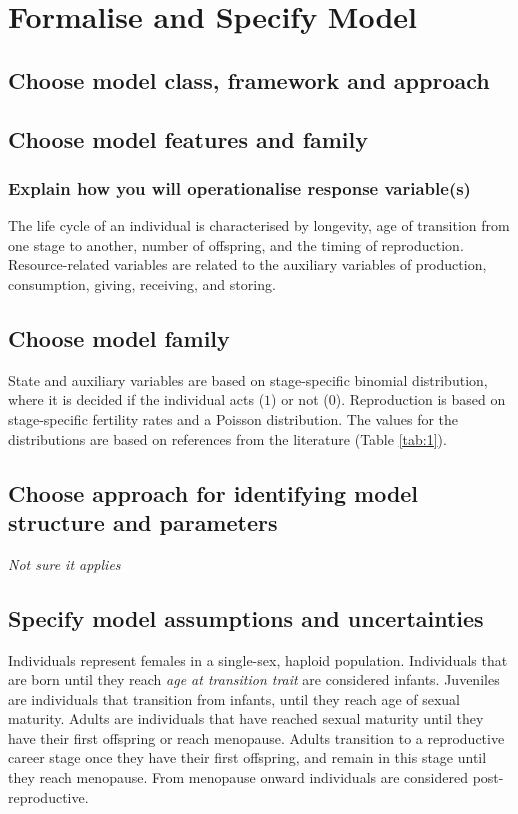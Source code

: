 \documentclass{article}
\begin{document}
\section{Formalise and Specify Model}

\subsection{Choose model class, framework and approach}


\subsection{Choose model features and family}

\subsubsection{Explain how you will operationalise response variable(s)}

The life cycle of an individual is characterised by longevity, age of transition from one stage to another, number of offspring, and the timing of reproduction. Resource-related variables are related to the auxiliary variables of production, consumption, giving, receiving, and storing.

\subsection{Choose model family}

State and auxiliary variables are based on stage-specific binomial distribution, where it is decided if the individual acts ($1$) or not ($0$). Reproduction is based on stage-specific fertility rates and a Poisson distribution. The values for the distributions are based on references from the literature (Table \ref{tab:1}).

\subsection{Choose approach for identifying model structure and parameters}

\emph{Not sure it applies}

\subsection{Specify model assumptions and uncertainties}

Individuals represent females in a single-sex, haploid population. Individuals that are born until they reach \emph{age at transition trait} are considered infants. Juveniles are individuals that transition from infants, until they reach age of sexual maturity. Adults are individuals that have reached sexual maturity until they have their first offspring or reach menopause. Adults transition to a reproductive career stage once they have their first offspring, and remain in this stage until they reach menopause. From menopause onward individuals are considered post-reproductive.
\end{document}
